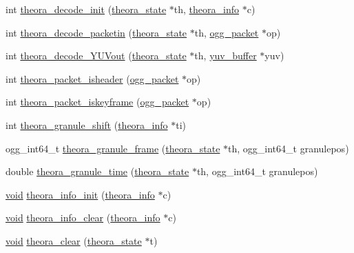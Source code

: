 \begin{DoxyCompactItemize}
\item 
int \hyperlink{group__oldfuncs_ga264907c66003799ff77ecbd09eb33d2c}{theora\+\_\+decode\+\_\+init} (\hyperlink{structtheora__state}{theora\+\_\+state} $\ast$th, \hyperlink{structtheora__info}{theora\+\_\+info} $\ast$c)
\item 
int \hyperlink{group__oldfuncs_gaa65a9e53b46fd54ab344bd599fa96975}{theora\+\_\+decode\+\_\+packetin} (\hyperlink{structtheora__state}{theora\+\_\+state} $\ast$th, \hyperlink{structogg__packet}{ogg\+\_\+packet} $\ast$op)
\item 
int \hyperlink{group__oldfuncs_ga09d47c80e1e94bff0a46a496816b8daa}{theora\+\_\+decode\+\_\+\+Y\+U\+Vout} (\hyperlink{structtheora__state}{theora\+\_\+state} $\ast$th, \hyperlink{structyuv__buffer}{yuv\+\_\+buffer} $\ast$yuv)
\item 
int \hyperlink{group__oldfuncs_gab969f9d0407683f0e5abe73d0839a25b}{theora\+\_\+packet\+\_\+isheader} (\hyperlink{structogg__packet}{ogg\+\_\+packet} $\ast$op)
\item 
int \hyperlink{group__oldfuncs_ga39ccc8f847a748d7074c926b4fdd12b2}{theora\+\_\+packet\+\_\+iskeyframe} (\hyperlink{structogg__packet}{ogg\+\_\+packet} $\ast$op)
\item 
int \hyperlink{group__oldfuncs_gacd9360e6a47139c761002410af457a02}{theora\+\_\+granule\+\_\+shift} (\hyperlink{structtheora__info}{theora\+\_\+info} $\ast$ti)
\item 
ogg\+\_\+int64\+\_\+t \hyperlink{group__oldfuncs_ga7bfa3ceb2fb4b41a282456c56e1dd269}{theora\+\_\+granule\+\_\+frame} (\hyperlink{structtheora__state}{theora\+\_\+state} $\ast$th, ogg\+\_\+int64\+\_\+t granulepos)
\item 
double \hyperlink{group__oldfuncs_ga4376358b12b9fa23ce6fe21cb5c65ac6}{theora\+\_\+granule\+\_\+time} (\hyperlink{structtheora__state}{theora\+\_\+state} $\ast$th, ogg\+\_\+int64\+\_\+t granulepos)
\item 
\hyperlink{png_8h_ac9c84fa68bbad002983e35ce3663c686}{void} \hyperlink{group__oldfuncs_ga3091c87d48f1faba018c5956379a6d90}{theora\+\_\+info\+\_\+init} (\hyperlink{structtheora__info}{theora\+\_\+info} $\ast$c)
\item 
\hyperlink{png_8h_ac9c84fa68bbad002983e35ce3663c686}{void} \hyperlink{group__oldfuncs_gaba7022d58edbc4825cacad03f68b3e0d}{theora\+\_\+info\+\_\+clear} (\hyperlink{structtheora__info}{theora\+\_\+info} $\ast$c)
\item 
\hyperlink{png_8h_ac9c84fa68bbad002983e35ce3663c686}{void} \hyperlink{group__oldfuncs_gab252d5d81b925136dda72e8f1c09c5eb}{theora\+\_\+clear} (\hyperlink{structtheora__state}{theora\+\_\+state} $\ast$t)

\end{DoxyCompactItemize}
